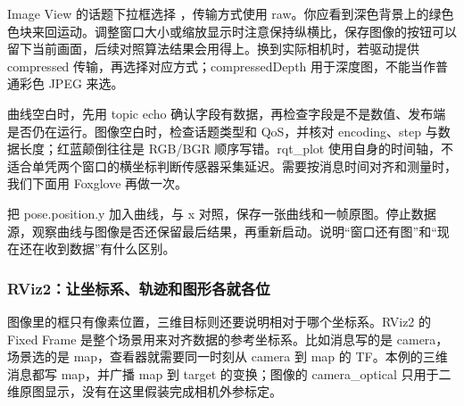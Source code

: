 \begin{example}[把位置变化与图像变化同时看见]
Image View 的话题下拉框选择 ，传输方式使用 raw。你应看到深色背景上的绿色色块来回运动。调整窗口大小或缩放显示时注意保持纵横比，保存图像的按钮可以留下当前画面，后续对照算法结果会用得上。换到实际相机时，若驱动提供 compressed 传输，再选择对应方式；compressedDepth 用于深度图，不能当作普通彩色 JPEG 来选。

曲线空白时，先用 topic echo 确认字段有数据，再检查字段是不是数值、发布端是否仍在运行。图像空白时，检查话题类型和 QoS，并核对 encoding、step 与数据长度；红蓝颠倒往往是 RGB/BGR 顺序写错。rqt\_plot 使用自身的时间轴，不适合单凭两个窗口的横坐标判断传感器采集延迟。需要按消息时间对齐和测量时，我们下面用 Foxglove 再做一次。
\end{example}

\begin{exercise}\label{ex:v2-ros-rqt-views}
把 pose.position.y 加入曲线，与 x 对照，保存一张曲线和一帧原图。停止数据源，观察曲线与图像是否还保留最后结果，再重新启动。说明“窗口还有图”和“现在还在收到数据”有什么区别。
\end{exercise}

\subsubsection{RViz2：让坐标系、轨迹和图形各就各位}
\label{sec:ros2-rviz}

图像里的框只有像素位置，三维目标则还要说明相对于哪个坐标系。RViz2 的 Fixed Frame 是整个场景用来对齐数据的参考坐标系。比如消息写的是 camera，场景选的是 map，查看器就需要同一时刻从 camera 到 map 的 TF。本例的三维消息都写 map，并广播 map 到 target 的变换；图像的 camera\_optical 只用于二维原图显示，没有在这里假装完成相机外参标定。

